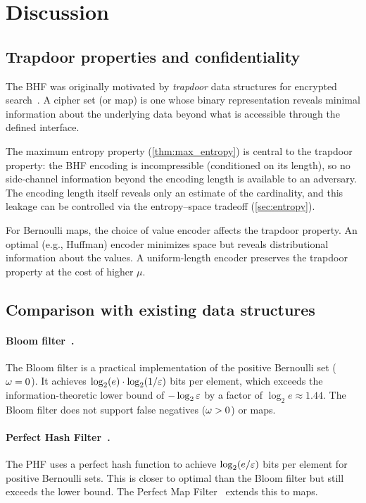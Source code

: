 \section{Discussion}
\label{sec:discussion}

\subsection{Trapdoor properties and confidentiality}

The BHF was originally motivated by \emph{trapdoor} data structures for
encrypted search~\cite{es}.
A cipher set (or map) is one whose binary representation reveals minimal
information about the underlying data beyond what is accessible through the
defined interface.

The maximum entropy property (\cref{thm:max_entropy}) is central to the
trapdoor property: the BHF encoding is incompressible (conditioned on its length),
so no side-channel information beyond the encoding length is available to an
adversary.
The encoding length itself reveals only an estimate of the cardinality, and
this leakage can be controlled via the entropy--space tradeoff
(\cref{sec:entropy}).

For Bernoulli maps, the choice of value encoder affects the trapdoor property.
An optimal (e.g., Huffman) encoder minimizes space but reveals distributional
information about the values.
A uniform-length encoder preserves the trapdoor property at the cost of higher $\mu$.

\subsection{Comparison with existing data structures}

\paragraph{Bloom filter~\cite{bloom1970,bf_survey}.}
The Bloom filter is a practical implementation of the positive Bernoulli set
($\omega = 0$).
It achieves $\log_2(e) \cdot \log_2(1/\varepsilon)$ bits per element, which
exceeds the information-theoretic lower bound of $-\log_2 \varepsilon$ by a
factor of $\log_2 e \approx 1.44$.
The Bloom filter does not support false negatives ($\omega > 0$) or maps.

\paragraph{Perfect Hash Filter~\cite{phf}.}
The PHF uses a perfect hash function to achieve $\log_2(e/\varepsilon)$ bits per
element for positive Bernoulli sets.
This is closer to optimal than the Bloom filter but still exceeds the lower
bound.
The Perfect Map Filter~\cite{pmf} extends this to maps.

